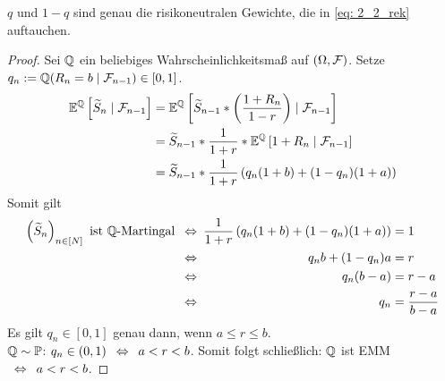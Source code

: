 \begin{*bemerkung_inline}
	$q$ und $1-q$ sind genau die risikoneutralen Gewichte, die in \eqref{eq: 2_2_rek} auftauchen.
\end{*bemerkung_inline}

\begin{proof}
	Sei $\mathbb{Q}$ ein beliebiges Wahrscheinlichkeitsmaß auf $(\Omega, \mathcal{F})$. Setze $q_n \mathrel{:=} \mathbb{Q}(R_n = b \mid \mathcal{F}_{n-1}) \in [0,1]$.
	\begin{equation*}
		\begin{aligned}
			\mathbb{E}^{\mathbb{Q}}\left[ \widetilde{S}_n \mid \mathcal{F}_{n-1} \right] &= \mathbb{E}^{\mathbb{Q}}\left[ \widetilde{S}_{n-1} * \left( \frac{1+R_n}{1-r} \right)  \mid \mathcal{F}_{n-1} \right] \\
			&= \widetilde{S}_{n-1} * \frac{1}{1+r} * \mathbb{E}^{\mathbb{Q}}\left[ 1+R_n \mid \mathcal{F}_{n-1} \right] \\
			&= \widetilde{S}_{n-1} * \frac{1}{1+r} \left( q_n (1+b) + (1-q_n)(1+a) \right)
		\end{aligned}
	\end{equation*}
	Somit gilt 
	\begin{equation*}
		\begin{alignedat}{2}
			\left( \widetilde{S}_n \right)_{n \in [N]} \text{ ist } \mathbb{Q} \text{-Martingal} &\enskip \Leftrightarrow \enskip &\frac{1}{1+r} \left( q_n (1+b) + (1-q_n)(1+a) \right) &= 1 \\
			&\enskip \Leftrightarrow \enskip &q_n b + (1-q_n) a &= r \\
			&\enskip \Leftrightarrow \enskip &q_n (b-a) &= r-a \\
			&\enskip \Leftrightarrow \enskip &q_n &= \frac{r-a}{b-a}
		\end{alignedat}
	\end{equation*}
	Es gilt $q_n \in [0,1]$ genau dann, wenn $a \le r \le b$. \\ 
	$\mathbb{Q} \sim \mathbb{P}$: $q_n \in (0,1) \enskip \Leftrightarrow \enskip a < r < b$.
	Somit folgt schließlich: $\mathbb{Q}$ ist EMM $\enskip \Leftrightarrow \enskip a < r < b$.
\end{proof}

